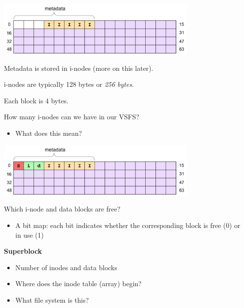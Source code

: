 \begin{slide}

    
    \includegraphics[width=100mm]{VSFS-2.png}
    \bigskip

    Metadata is stored in i-nodes (more on this later).
    \bigskip

    i-nodes are typically 128 bytes or \textit{256 bytes}.

    Each block is 4 bytes.
    \bigskip

    How many i-nodes can we have in our VSFS?
    \begin{itemize}
        \item What does this mean?
    \end{itemize}

\end{slide}

\begin{slide}


    \includegraphics[width=100mm]{VSFS-3.png}
    \bigskip

    Which i-node and data blocks are free?
    \begin{itemize}
        \item A bit map: each bit indicates whether the corresponding block is free (0) or in use (1)
    \end{itemize}
    \bigskip

    \textbf{Superblock}
    \begin{itemize}
        \item Number of inodes and data blocks
        \item Where does the inode table (array) begin?
        \item What file system is this?
    \end{itemize}

\end{slide}

